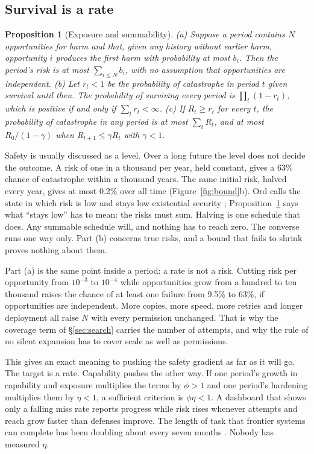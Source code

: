 \documentclass[10pt,twocolumn]{article}
\theoremstyle{plain}
\newtheorem{proposition}{Proposition}
\theoremstyle{definition}
\begin{document}
\subsection{Survival is a rate}

\begin{proposition}[Exposure and summability]\label{prop:sum}
(a) Suppose a period contains $N$ opportunities for harm and that, given any history without
earlier harm, opportunity $i$ produces the first harm with probability at most $b_{i}$. Then
the period's risk is at most $\sum_{i\le N}b_{i}$, with no assumption that opportunities are
independent. (b) Let $r_{t}<1$ be the probability of catastrophe in period $t$ given survival
until then. The probability of surviving every period is $\prod_{t}(1-r_{t})$, which is
positive if and only if $\sum_{t}r_{t}<\infty$. (c) If $R_{t}\ge r_{t}$ for every $t$, the
probability of catastrophe in any period is at most $\sum_{t}R_{t}$, and at most
$R_{0}/(1-\gamma)$ when $R_{t+1}\le\gamma R_{t}$ with $\gamma<1$.
\end{proposition}

Safety is usually discussed as a level. Over a long future the level does not decide the
outcome. A risk of one in a thousand per year, held constant, gives a 63\% chance of
catastrophe within a thousand years. The same initial risk, halved every year, gives at most
0.2\% over all time (Figure~\ref{fig:bound}b). Ord calls the state in which risk is low and
stays low existential security \cite{ord2020}; Proposition~\ref{prop:sum} says what ``stays low'' has to mean: the
risks must sum. Halving is one schedule that does. Any summable schedule will, and nothing
has to reach zero. The converse runs one way only. Part (b) concerns true risks, and a bound
that fails to shrink proves nothing about them.

Part (a) is the same point inside a period: a rate is not a risk. Cutting risk per
opportunity from $10^{-3}$ to $10^{-4}$ while opportunities grow from a hundred to ten
thousand raises the chance of at least one failure from 9.5\% to 63\%, if opportunities are
independent. More copies, more speed, more retries and longer deployment all raise $N$ with
every permission unchanged. That is why the coverage term of \S\ref{sec:search} carries the
number of attempts, and why the rule of no silent expansion has to cover scale as well as
permissions.

This gives an exact meaning to pushing the safety gradient as far as it will go. The target is a rate. Capability pushes
the other way. If one period's growth in capability and exposure multiplies the terms by $\phi>1$ and
one period's hardening multiplies them by $\eta<1$, a sufficient criterion is $\phi\eta<1$. A dashboard
that shows only a falling miss rate reports progress while risk rises whenever attempts and
reach grow faster than defenses improve. The length of task that frontier systems can
complete has been doubling about every seven months \cite{kwa2025}. Nobody has measured
$\eta$.
\end{document}
